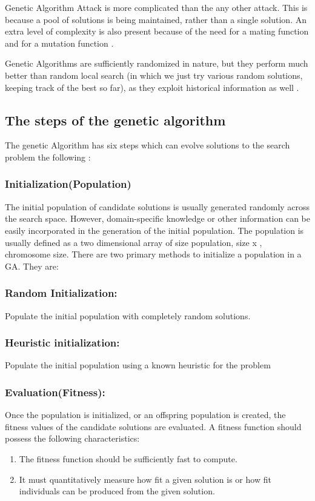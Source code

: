 Genetic Algorithm Attack is more complicated than the  any other attack. This is because a pool of solutions is being maintained, rather than a single solution.
An extra level of complexity is also present because of the
need for a mating function and for a mutation function \cite{dimovski2003attacks}.

Genetic Algorithms are sufficiently randomized in nature, but they perform much better than random local search (in which we just try various random solutions, keeping track of the best so far), as they exploit historical information as well \cite{GAs}.
\newpage
\subsection{The steps of the genetic algorithm}
The genetic Algorithm has six steps which can evolve solutions to the search problem the following \cite{sastry2005genetic}:
\subsubsection{Initialization(Population)}
The initial population of candidate solutions is usually generated
randomly across the search space. However, domain-specific knowledge or other
information can be easily incorporated in the generation of the initial population.
The population is usually defined as a two dimensional array of size population, size x , chromosome size.
There are two primary methods to initialize a population in a GA. They are:
\subsubsection{Random Initialization:} Populate the initial population with completely random solutions.
\subsubsection{Heuristic initialization:} Populate the initial population using a known heuristic for the problem

\subsubsection{Evaluation(Fitness):}
Once the population is initialized, or an offspring population is created, the fitness values of the candidate solutions are evaluated.
A fitness function should possess the following characteristics:
\begin{enumerate}
    \item{The fitness function should be sufficiently fast to compute.}
    \item{It must quantitatively measure how fit a given solution is or how fit individuals can be produced from the given solution.}
\end{enumerate}

